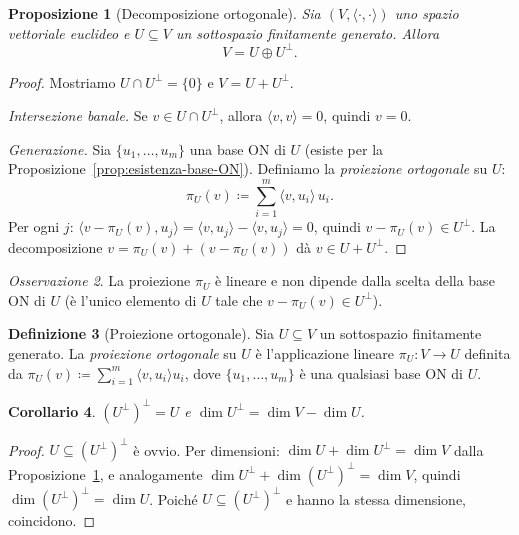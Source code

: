 \documentclass[11pt, a4paper]{book}
\theoremstyle{definition}
\newtheorem{definizione}{Definizione}[section]
\theoremstyle{plain}
\newtheorem{proposizione}[definizione]{Proposizione}
\newtheorem{corollario}[definizione]{Corollario}
\theoremstyle{remark}
\newtheorem{osservazione}[definizione]{Osservazione}
\begin{document}
\begin{proposizione}[Decomposizione ortogonale]
\label{prop:decomp-ortogonale}
Sia $(V,\langle\cdot,\cdot\rangle)$ uno spazio vettoriale euclideo e $U \subseteq V$ un sottospazio finitamente generato. Allora
\[
  V = U \oplus U^\perp.
\]
\end{proposizione}

\begin{proof}
Mostriamo $U \cap U^\perp = \{0\}$ e $V = U + U^\perp$.

\emph{Intersezione banale.} Se $v \in U \cap U^\perp$, allora $\langle v,v\rangle = 0$, quindi $v=0$.

\emph{Generazione.} Sia $\{u_1,\ldots,u_m\}$ una base ON di $U$ (esiste per la Proposizione~\ref{prop:esistenza-base-ON}). Definiamo la \emph{proiezione ortogonale} su $U$:
\[
  \pi_U(v) \coloneqq \sum_{i=1}^m \langle v,u_i\rangle\, u_i.
\]
Per ogni $j$: $\langle v - \pi_U(v), u_j\rangle = \langle v,u_j\rangle - \langle v,u_j\rangle = 0$, quindi $v - \pi_U(v) \in U^\perp$. La decomposizione $v = \pi_U(v) + (v - \pi_U(v))$ dà $v \in U + U^\perp$.
\end{proof}

\begin{osservazione}
La proiezione $\pi_U$ è lineare e non dipende dalla scelta della base ON di $U$ (è l'unico elemento di $U$ tale che $v - \pi_U(v) \in U^\perp$).
\end{osservazione}

\begin{defbox}
\begin{definizione}[Proiezione ortogonale]
Sia $U \subseteq V$ un sottospazio finitamente generato. La \emph{proiezione ortogonale} su $U$ è l'applicazione lineare $\pi_U \colon V \to U$ definita da $\pi_U(v) \coloneqq \sum_{i=1}^m \langle v,u_i\rangle u_i$, dove $\{u_1,\ldots,u_m\}$ è una qualsiasi base ON di $U$.
\end{definizione}
\end{defbox}

\begin{corollario}
\label{cor:ortogonale-doppio}
$(U^\perp)^\perp = U$ e $\dim U^\perp = \dim V - \dim U$.
\end{corollario}

\begin{proof}
$U \subseteq (U^\perp)^\perp$ è ovvio. Per dimensioni: $\dim U + \dim U^\perp = \dim V$ dalla Proposizione~\ref{prop:decomp-ortogonale}, e analogamente $\dim U^\perp + \dim(U^\perp)^\perp = \dim V$, quindi $\dim(U^\perp)^\perp = \dim U$. Poiché $U \subseteq (U^\perp)^\perp$ e hanno la stessa dimensione, coincidono.
\end{proof}
\end{document}

